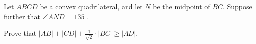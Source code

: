 Let $ABCD$ be a convex quadrilateral, and let $N$ be the midpoint of $BC$. Suppose further that $\angle AND=135^{\circ}$.

Prove that $|AB|+|CD|+\frac{1}{\sqrt{2}}\cdot |BC|\ge |AD|.$